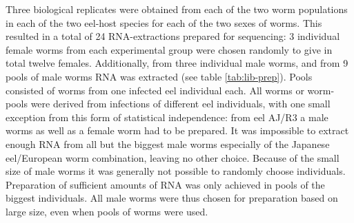 Three biological replicates were obtained from each of the two worm
populations in each of the two eel-host species for each of the two
sexes of worms. This resulted in a total of 24 RNA-extractions
prepared for sequencing: 3 individual female worms from each
experimental group were chosen randomly to give in total twelve
females. Additionally, from three individual male worms, and from 9
pools of male worms RNA was extracted (see table
\ref{tab:lib-prep}). Pools consisted of worms from one infected eel
individual each. All worms or worm-pools were derived from infections
of different eel individuals, with one small exception from this form
of statistical independence: from eel AJ/R3 a male worms as well as a
female worm had to be prepared. It was impossible to extract enough
RNA from all but the biggest male worms especially of the Japanese
eel/European worm combination, leaving no other choice. Because of the
small size of male worms it was generally not possible to randomly
choose individuals. Preparation of sufficient amounts of RNA was only
achieved in pools of the biggest individuals. All male worms were thus
chosen for preparation based on large size, even when pools of worms
were used.

